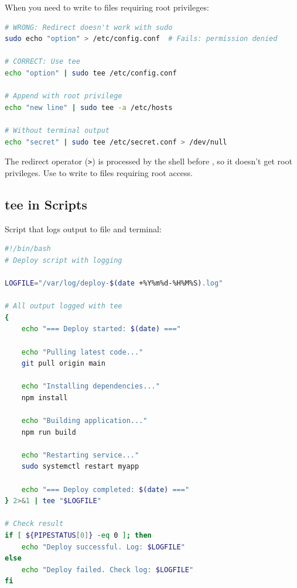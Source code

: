 When you need to write to files requiring root privileges:

\begin{lstlisting}[language=bash, caption={tee with sudo}]
# WRONG: Redirect doesn't work with sudo
sudo echo "option" > /etc/config.conf  # Fails: permission denied

# CORRECT: Use tee
echo "option" | sudo tee /etc/config.conf

# Append with root privilege
echo "new line" | sudo tee -a /etc/hosts

# Without terminal output
echo "secret" | sudo tee /etc/secret.conf > /dev/null
\end{lstlisting}

\begin{notebox}
	The redirect operator (\texttt{>}) is processed by the shell before , so it doesn't get root privileges. Use  to write to files requiring root access.
\end{notebox}

\subsection{tee in Scripts}

\begin{examplebox}
	Script that logs output to file and terminal:

	\begin{lstlisting}[language=bash]
#!/bin/bash
# Deploy script with logging

LOGFILE="/var/log/deploy-$(date +%Y%m%d-%H%M%S).log"

# All output logged with tee
{
    echo "=== Deploy started: $(date) ==="

    echo "Pulling latest code..."
    git pull origin main

    echo "Installing dependencies..."
    npm install

    echo "Building application..."
    npm run build

    echo "Restarting service..."
    sudo systemctl restart myapp

    echo "=== Deploy completed: $(date) ==="
} 2>&1 | tee "$LOGFILE"

# Check result
if [ ${PIPESTATUS[0]} -eq 0 ]; then
    echo "Deploy successful. Log: $LOGFILE"
else
    echo "Deploy failed. Check log: $LOGFILE"
fi
\end{lstlisting}
\end{examplebox}

